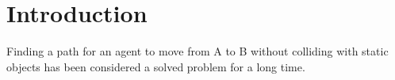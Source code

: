 \section{Introduction}
Finding a path for an agent to move from A to B without colliding with static objects has been considered a solved problem for a long time.